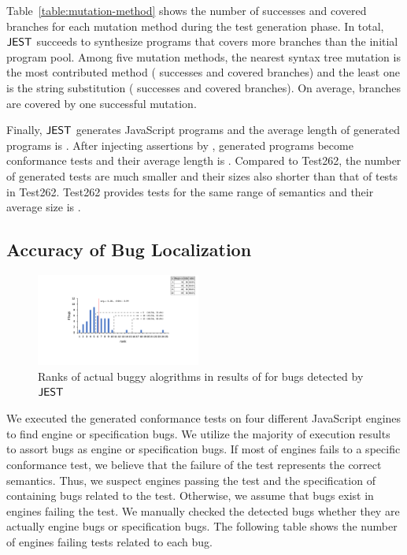 Table~\ref{table:mutation-method} shows the number of successes and covered
branches for each mutation method during the test generation phase.  In total,
$\tool$ succeeds to synthesize  programs that covers 
more branches than the initial program pool.  Among five mutation methods, the
nearest syntax tree mutation is the most contributed method (
successes and  covered branches) and the least one is the string
substitution ( successes and  covered branches).  On average,
 branches are covered by one successful mutation.

Finally, $\tool$ generates  JavaScript programs and the average
length of generated programs is .  After injecting assertions by
, generated programs become conformance tests and
their average length is .  Compared to Test262, the number of
generated tests are much smaller and their sizes also shorter than that of tests
in Test262.  Test262 provides  tests for the same range of
semantics and their average size is .


\subsection{Accuracy of Bug Localization}

\begin{figure}[t]
  \centering
  \includegraphics[width=0.48\textwidth]{img/localize.pdf}
  \caption{Ranks of actual buggy alogrithms in results of 
    for bugs detected by $\tool$}
  \label{fig:localize}
  \vspace*{-1em}
\end{figure}

We executed the generated conformance tests on four different JavaScript engines
to find engine or specification bugs.  We utilize the majority of execution
results to assort bugs as engine or specification bugs.  If most of engines
fails to a specific conformance test, we believe that the failure of the test
represents the correct semantics.  Thus, we suspect engines passing the test and
the specification of containing bugs related to the test.  Otherwise, we assume
that bugs exist in engines failing the test.  We manually checked the detected
bugs whether they are actually engine bugs or specification bugs.  The following
table shows the number of engines failing tests related to each bug.

